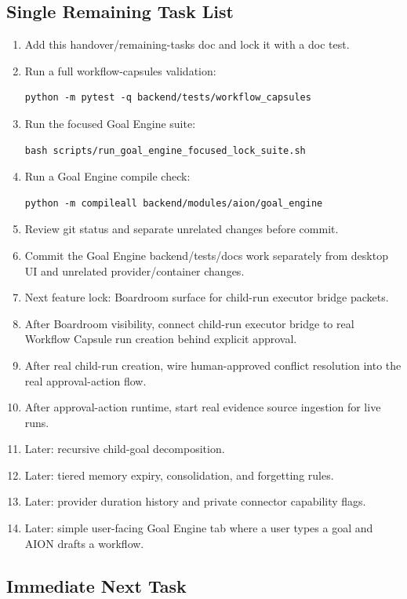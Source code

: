 \subsection{Single Remaining Task List}

\begin{enumerate}
  \item Add this handover/remaining-tasks doc and lock it with a doc test.
  \item Run a full workflow-capsules validation:
\begin{verbatim}
python -m pytest -q backend/tests/workflow_capsules
\end{verbatim}
  \item Run the focused Goal Engine suite:
\begin{verbatim}
bash scripts/run_goal_engine_focused_lock_suite.sh
\end{verbatim}
  \item Run a Goal Engine compile check:
\begin{verbatim}
python -m compileall backend/modules/aion/goal_engine
\end{verbatim}
  \item Review git status and separate unrelated changes before commit.
  \item Commit the Goal Engine backend/tests/docs work separately from desktop UI and unrelated provider/container changes.
  \item Next feature lock: Boardroom surface for child-run executor bridge packets.
  \item After Boardroom visibility, connect child-run executor bridge to real Workflow Capsule run creation behind explicit approval.
  \item After real child-run creation, wire human-approved conflict resolution into the real approval-action flow.
  \item After approval-action runtime, start real evidence source ingestion for live runs.
  \item Later: recursive child-goal decomposition.
  \item Later: tiered memory expiry, consolidation, and forgetting rules.
  \item Later: provider duration history and private connector capability flags.
  \item Later: simple user-facing Goal Engine tab where a user types a goal and AION drafts a workflow.
\end{enumerate}

\subsection{Immediate Next Task}

